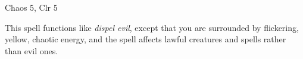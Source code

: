 
\begin{description*}
\item[Level:] Chaos 5, Clr 5
\end{description*}

This spell functions like \textit{dispel evil}, except that you are surrounded
by flickering, yellow, chaotic energy, and the spell affects lawful creatures and
spells rather than evil ones.